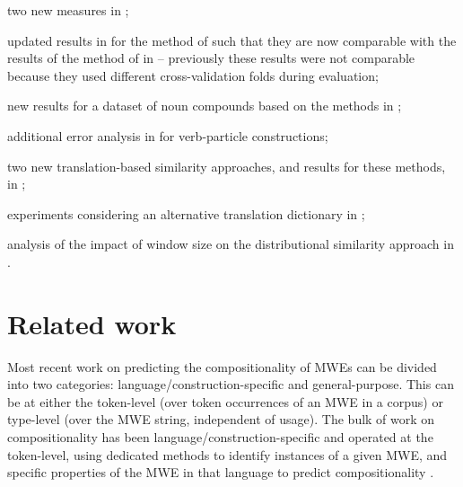 \documentclass[output=paper
,modfonts
,nonflat]{langsci/langscibook}
\begin{document}
\begin{compactitem}
\item two new  measures in
  ;
\item updated results in  for the method of
  \cite{salehi2013} such that they are now comparable with the results
  of the method of \cite{DBLP:conf/eacl/SalehiCB14} in
   -- previously these results were not
  comparable because they used different cross-validation folds during
  evaluation;
\item new results for a dataset of  noun compounds
  based on the  methods in ;
\item additional error analysis in  for
   verb-particle constructions;
\item two new translation-based similarity approaches, and results
  for these methods, in ;
\item experiments considering an alternative translation dictionary in
  ;
\item analysis of the impact of window size on the distributional
  similarity approach in .
\end{compactitem}

\section{Related work}
\label{sec:RW}


Most recent work on predicting the compositionality of MWEs can be
divided into two categories: language/construction-specific and
general-purpose. This can be at either the token-level (over token
occurrences of an MWE in a corpus) or type-level (over the MWE string,
independent of usage). The bulk of work on compositionality has been
language/construction-specific and operated at the token-level, using
dedicated methods to identify instances of a given MWE, and specific
properties of the MWE in that language to predict compositionality
\citep{lin1999,kim2007,fazly-cook-stevenson:2009:CL}.
\end{document}
